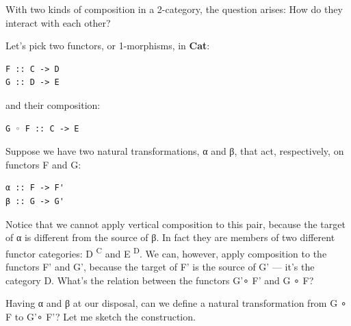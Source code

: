 \noindent
With two kinds of composition in a 2-category, the question arises: How
do they interact with each other?

Let's pick two functors, or 1-morphisms, in \textbf{Cat}:

\begin{verbatim}
F :: C -> D
G :: D -> E
\end{verbatim}
and their composition:

\begin{verbatim}
G ◦ F :: C -> E
\end{verbatim}
Suppose we have two natural transformations, α and β, that act,
respectively, on functors F and G:

\begin{verbatim}
α :: F -> F'
β :: G -> G'
\end{verbatim}

\begin{figure}[H]
\centering
{}
\end{figure}

\noindent
Notice that we cannot apply vertical composition to this pair, because
the target of α is different from the source of β. In fact they are
members of two different functor categories: D \textsuperscript{C} and E
\textsuperscript{D}. We can, however, apply composition to the functors
F' and G', because the target of F' is the source of G' --- it's the
category D. What's the relation between the functors G'∘ F' and G ∘ F?

Having α and β at our disposal, can we define a natural transformation
from G ∘ F to G'∘ F'? Let me sketch the construction.

\begin{figure}[H]
\centering
{}
\end{figure}

